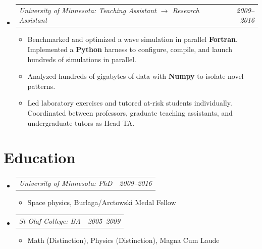 \documentclass[12pt,letterpaper]{article}
\makeatletter
\newcommand{\headerpair}[2]{
    \begin{tabular*}{\linewidth}{l@{ \extracolsep{\fill} }r} {\large\emph{#1}} & {\large\emph{#2}}
    \end{tabular*}
}
\newcommand{\headerrow}[3]{\headerpair{#2: #1}{#3}}
\newcommand{\ResumeSection}[1]{\section*{{\color{MidnightBlue}#1 \sout{\hfill}}}}
\makeatother
\begin{document}
\begin{itemize}[leftmargin=\parindent]
    \item[]
        \headerrow
            {Teaching Assistant $\to$ Research Assistant}
            {University of Minnesota}
            {2009--2016}
        \begin{itemize}[leftmargin=\parindent]
            \item Benchmarked and optimized a wave simulation in parallel \textbf{Fortran}. Implemented a \textbf{Python} harness to configure, compile, and launch hundreds of simulations in parallel.
            \item Analyzed hundreds of gigabytes of data with \textbf{Numpy} to isolate novel patterns.
            \item Led laboratory exercises and tutored at-risk students individually. Coordinated between professors, graduate teaching assistants, and undergraduate tutors as Head TA.
        \end{itemize}

\end{itemize}


\ResumeSection{Education}

\begin{itemize}[leftmargin=\parindent]
    \parskip=0.1em
    \itemsep=1.2em

    \item[]
        \headerrow
            {PhD}
            {University of Minnesota}
            {2009--2016}
        \begin{itemize}[leftmargin=\parindent]
            \item Space physics, Burlaga/Arctowski Medal Fellow
        \end{itemize}
    \item[]
        \headerrow
            {BA}
            {St Olaf College}
            {2005--2009}
        \begin{itemize}[leftmargin=\parindent]
            \item Math (Distinction), Physics (Distinction),
                 Magna Cum Laude
        \end{itemize}
\end{itemize}
\end{document}
